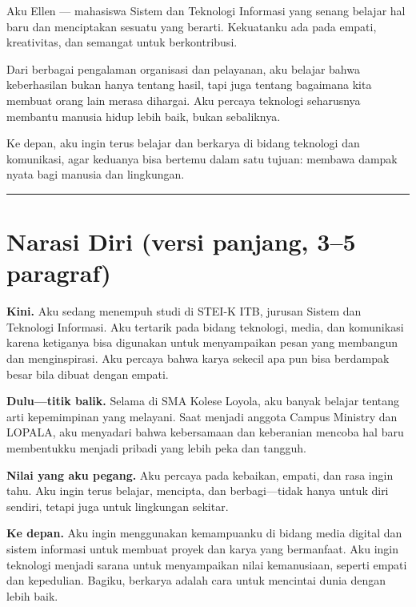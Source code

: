 \documentclass[
  letterpaper,
  DIV=11,
  numbers=noendperiod]{scrreprt}
\begin{document}
Aku Ellen --- mahasiswa Sistem dan Teknologi Informasi yang senang
belajar hal baru dan menciptakan sesuatu yang berarti. Kekuatanku ada
pada empati, kreativitas, dan semangat untuk berkontribusi.

Dari berbagai pengalaman organisasi dan pelayanan, aku belajar bahwa
keberhasilan bukan hanya tentang hasil, tapi juga tentang bagaimana kita
membuat orang lain merasa dihargai. Aku percaya teknologi seharusnya
membantu manusia hidup lebih baik, bukan sebaliknya.

Ke depan, aku ingin terus belajar dan berkarya di bidang teknologi dan
komunikasi, agar keduanya bisa bertemu dalam satu tujuan: membawa dampak
nyata bagi manusia dan lingkungan.

\begin{center}\rule{0.5\linewidth}{0.5pt}\end{center}

\section{Narasi Diri (versi panjang, 3--5
paragraf)}\label{narasi-diri-versi-panjang-35-paragraf}

\textbf{Kini.} Aku sedang menempuh studi di STEI-K ITB, jurusan Sistem
dan Teknologi Informasi. Aku tertarik pada bidang teknologi, media, dan
komunikasi karena ketiganya bisa digunakan untuk menyampaikan pesan yang
membangun dan menginspirasi. Aku percaya bahwa karya sekecil apa pun
bisa berdampak besar bila dibuat dengan empati.

\textbf{Dulu---titik balik.} Selama di SMA Kolese Loyola, aku banyak
belajar tentang arti kepemimpinan yang melayani. Saat menjadi anggota
Campus Ministry dan LOPALA, aku menyadari bahwa kebersamaan dan
keberanian mencoba hal baru membentukku menjadi pribadi yang lebih peka
dan tangguh.

\textbf{Nilai yang aku pegang.} Aku percaya pada kebaikan, empati, dan
rasa ingin tahu. Aku ingin terus belajar, mencipta, dan berbagi---tidak
hanya untuk diri sendiri, tetapi juga untuk lingkungan sekitar.

\textbf{Ke depan.} Aku ingin menggunakan kemampuanku di bidang media
digital dan sistem informasi untuk membuat proyek dan karya yang
bermanfaat. Aku ingin teknologi menjadi sarana untuk menyampaikan nilai
kemanusiaan, seperti empati dan kepedulian. Bagiku, berkarya adalah cara
untuk mencintai dunia dengan lebih baik.

\end{document}
